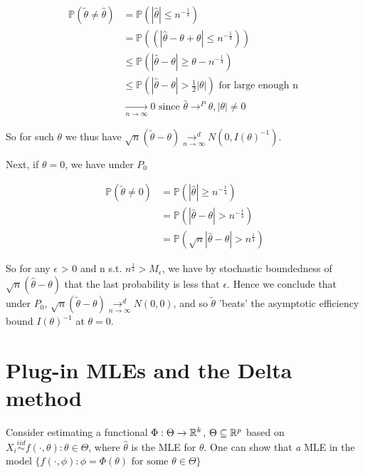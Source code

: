 \documentclass[a4paper]{article}
\begin{document}
\begin{remark}
\begin{enumerate}
		 \begin{align*}
			 \mathbb{P}\left( \tilde{\theta} \neq \hat{\theta} \right) &= \mathbb{P}\left( |\hat{\theta}| \le n^{- \frac{1}{4}} \right) \\
			 &= \mathbb{P}\left( \left( |\hat{\theta} - \theta + \theta| \le n^{- \frac{1}{4}} \right)  \right) \\
			 &\le \mathbb{P}\left( |\hat{\theta} - \theta| \ge \theta - n^{- \frac{1}{4}} \right) \\
			 &\le \mathbb{P}\left( |\hat{\theta} - \theta| > \frac{1}{2}|\theta| \right) \text{ for large enough n } \\
			 &\underset{n\to \infty}{\to } 0 \text{ since  } \hat{\theta} \to ^{P} \theta, |\theta|\neq 0
		 \end{align*}

		 So for such $\theta$ we thus have $\sqrt{n} (\tilde{\theta} - \theta) \underset{n\to \infty}{\to ^{d}} N(0, I(\theta)^{-1})$.

		 Next, if $\theta = 0$, we have under  $P_0$

		 \begin{align*}
		 	\mathbb{P}\left( \tilde{\theta} \neq 0 \right) &= \mathbb{P}\left( |\hat{\theta}| \ge n^{- \frac{1}{4}} \right) \\
			&= \mathbb{P}\left( |\hat{\theta} - \theta| > n^{- \frac{1}{4}} \right) \\
			&= \mathbb{P}\left( \sqrt{n}|\hat{\theta} - \theta| > n^{\frac{1}{4}}  \right)
		 \end{align*}

		 So for any $\epsilon$ > 0 and n s.t. $n^{\frac{1}{4}} > M_{\epsilon}$, we have by stochastic boundedness of $\sqrt{n}(\hat{\theta} - \theta) $ that the last probability is less that $\epsilon$. Hence we conclude that under  $P_0$, $\sqrt{n}(\tilde{\theta} - \theta) \underset{n\to \infty}{\to ^{d}} N(0,0)$, and so $\tilde{\theta}$ 'beats' the asymptotic efficiency bound $I(\theta)^{-1}$ at $\theta = 0$.
	\end{enumerate}
\end{remark}

\section{Plug-in MLEs and the Delta method}

Consider estimating a functional $\Phi : \Theta \to \mathbb{R}^{k}$, $\Theta \subseteq \mathbb{R}^{p}$ based on $X_i \stackrel{iid}{\sim} {f\left( \cdot , \theta \right) : \theta \in \Theta }$, where $\hat{\theta}$ is the MLE for $\theta$. One can show that \textit{a} MLE in the model  $\{f\left( \cdot , \phi \right) : \phi = \Phi(\theta) \text{ for some } \theta \in \Theta \}$
\end{document}
